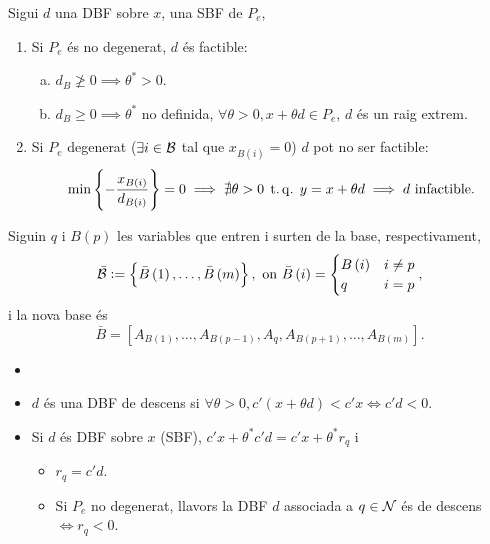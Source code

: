 \begin{prop}
    Sigui $d$ una DBF sobre $x$, una SBF de $P_e$,
    \begin{enumerate}
        \item Si $P_e$ és no degenerat, $d$ és factible:
            \begin{enumerate}[a)]
                \item $d_B \ngeq 0 \implies \theta^* > 0$.
                \item $d_B \geq 0 \implies \theta^*$ no definida, $\forall \theta > 0, x + \theta d \in P_e,\, d$ és un raig extrem.
            \end{enumerate}
        \item Si $P_e$ degenerat ($\exists i \in \mathcal{B}$ tal que $x_{B\left(i\right)} = 0$) $d$ pot no ser factible:
            \begin{gather*}
                \min \left\{ -\frac{x_{B\left(i\right)}}{d_{B\left(i\right)}} \right\} = 0 \implies \nexists \theta > 0 \operatorname{\;t.q.\;} y = x+\theta d \implies d \text{ infactible}.
            \end{gather*}
    \end{enumerate}
\end{prop}
\begin{prop}
    Siguin $q$ i $B\left(p\right)$ les variables que entren i surten de la base, respectivament,
    \begin{gather*}
        \bar{\mathcal{B}} := \left\{ \bar{B}\left(1\right), \dots, \bar{B}\left(m\right) \right\}, \text{ on } \bar{B}\left(i\right) =
        \begin{cases}
            B\left(i\right) & i \neq p \\
            q & i = p
        \end{cases},
    \end{gather*}
    i la nova base és
    \[ \bar{B} = \left[A_{B\left(1\right)}, \dots, A_{B\left(p-1\right)}, A_q, A_{B\left(p+1\right)}, \dots, A_{B\left(m\right)} \right]. \]
\end{prop}
\begin{defi}
    \begin{itemize}
        \item[]
        \item $d$ és una DBF de descens si $\forall \theta > 0, c'\left(x + \theta d\right) < c'x \iff c'd < 0$.
        \item Si $d$ és DBF sobre $x$ (SBF), $c'x + \theta^*c'd = c'x + \theta^*r_q$ i
            \begin{itemize}
                \item $r_q = c'd$.
                \item Si $P_e$ no degenerat, llavors la DBF $d$ associada a $q \in \mathcal{N}$ és de descens $\iff r_q < 0$.
            \end{itemize}
    \end{itemize}
\end{defi}

